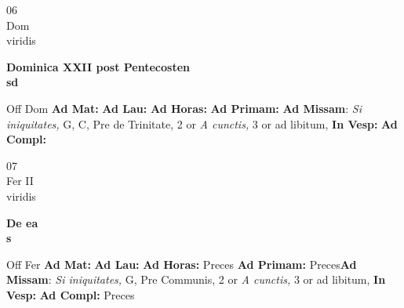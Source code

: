 \documentclass[10pt, openany]{book}
\begin{document}
    \begin{center}
        \begin{minipage}{3.5in}
            \vspace{2em}
            \begin{minipage}{0.5in}
                {\Huge 06} \\
                {\normalsize Dom} \\
                {\normalsize viridis}
            \end{minipage}
            \begin{minipage}{3.0in}
                \textbf{ \large Dominica XXII post Pentecosten \\
                \textnormal{\normalsize sd}} \\ 
            \end{minipage}
            \begin{justify}Off Dom
                \textbf{Ad Mat: }
                \textbf{Ad Lau: }
                \textbf{Ad Horas: }
                \textbf{Ad Primam: }\textbf{Ad Missam}: \textit{Si iniquitates,} G, C, Pre de Trinitate, 2 or \textit{A cunctis,} 3 or ad libitum,  
                \textbf{In Vesp: }
                \textbf{Ad Compl: }
            \end{justify}
        \end{minipage}
    \end{center}

    \begin{center}
        \begin{minipage}{3.5in}
            \vspace{2em}
            \begin{minipage}{0.5in}
                {\Huge 07} \\
                {\normalsize Fer II} \\
                {\normalsize viridis}
            \end{minipage}
            \begin{minipage}{3.0in}
                \textbf{ \large De ea \\
                \textnormal{\normalsize s}} \\ 
            \end{minipage}
            \begin{justify}Off Fer
                \textbf{Ad Mat: }
                \textbf{Ad Lau: }
                \textbf{Ad Horas: }Preces
                \textbf{Ad Primam: }Preces\textbf{Ad Missam}: \textit{Si iniquitates,} G, Pre Communis, 2 or \textit{A cunctis,} 3 or ad libitum,  
                \textbf{In Vesp: }
                \textbf{Ad Compl: }Preces
            \end{justify}
        \end{minipage}
    \end{center}
\end{document}

